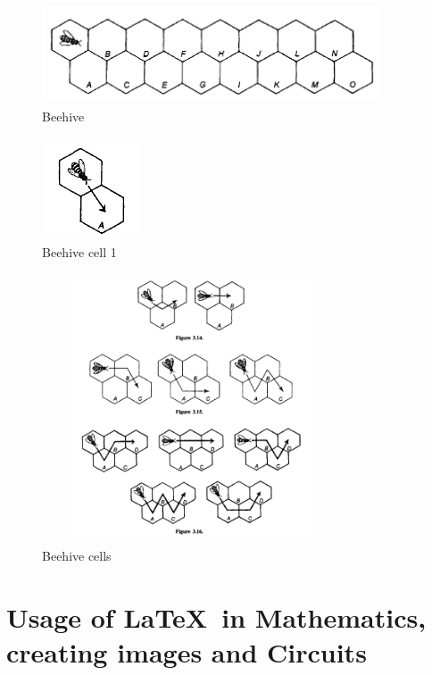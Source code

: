 \documentclass[10pt]{report}
\begin{document}
{\pagecolor{yellow!40}
\begin{figure}[!ht]
	\centering
	\includegraphics[height=3cm, width=10cm ]{bee.png}
	\caption{Beehive}
	\label{fig-3}
\end{figure}
\begin{figure}[!ht]
	\centering
	\includegraphics[height=3cm, width= 3cm ]{bee1.png}
	\caption{Beehive cell 1}
	\label{fig-4}
\end{figure}
\begin{figure}[h!]
	\centering
	\includegraphics[height=8cm, width= 9cm ]{bee2.png}
	\caption{Beehive cells}
	\label{fig-5}
\end{figure}

\chapter{Usage of \LaTeX\ in Mathematics, creating images  and Circuits}
}
\end{document}

